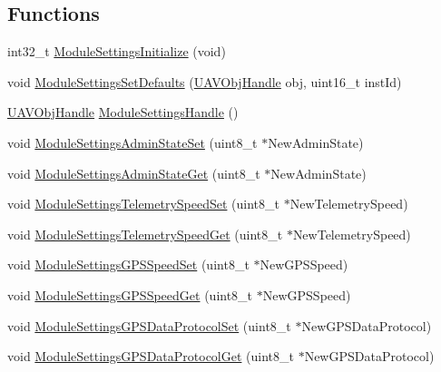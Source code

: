 \subsection*{\-Functions}
\begin{DoxyCompactItemize}
\item 
int32\-\_\-t \hyperlink{group___module_settings_ga839c4047fd745594e796c52e8aa0cbe9}{\-Module\-Settings\-Initialize} (void)
\item 
void \hyperlink{group___module_settings_gaf3ff760bf9cfe5f68cb45fad9c0c02fc}{\-Module\-Settings\-Set\-Defaults} (\hyperlink{targets_2_u_a_v_objects_2inc_2uavobjectmanager_8h_a279053e22be53ce9f895043aaeb91e3b}{\-U\-A\-V\-Obj\-Handle} obj, uint16\-\_\-t inst\-Id)
\item 
\hyperlink{targets_2_u_a_v_objects_2inc_2uavobjectmanager_8h_a279053e22be53ce9f895043aaeb91e3b}{\-U\-A\-V\-Obj\-Handle} \hyperlink{group___module_settings_ga818381d41749d1434bbc59c874a75cc6}{\-Module\-Settings\-Handle} ()
\item 
void \hyperlink{group___module_settings_ga289f9575e5b11b25372c843e8343c9b2}{\-Module\-Settings\-Admin\-State\-Set} (uint8\-\_\-t $\ast$\-New\-Admin\-State)
\item 
void \hyperlink{group___module_settings_gaabf539bcae60bf9ec5b422e99fec1905}{\-Module\-Settings\-Admin\-State\-Get} (uint8\-\_\-t $\ast$\-New\-Admin\-State)
\item 
void \hyperlink{group___module_settings_ga547561fa150a4162482213a50b62613f}{\-Module\-Settings\-Telemetry\-Speed\-Set} (uint8\-\_\-t $\ast$\-New\-Telemetry\-Speed)
\item 
void \hyperlink{group___module_settings_ga88fe6a15759f5c3ae5e293767026f3a0}{\-Module\-Settings\-Telemetry\-Speed\-Get} (uint8\-\_\-t $\ast$\-New\-Telemetry\-Speed)
\item 
void \hyperlink{group___module_settings_ga67597189dff6c21ce3ffec1db754e1cb}{\-Module\-Settings\-G\-P\-S\-Speed\-Set} (uint8\-\_\-t $\ast$\-New\-G\-P\-S\-Speed)
\item 
void \hyperlink{group___module_settings_ga018720efbf54bc1588ea0b4957d4f7b4}{\-Module\-Settings\-G\-P\-S\-Speed\-Get} (uint8\-\_\-t $\ast$\-New\-G\-P\-S\-Speed)
\item 
void \hyperlink{group___module_settings_gac2260d6c0470c5ddd9379bae4a03fa0a}{\-Module\-Settings\-G\-P\-S\-Data\-Protocol\-Set} (uint8\-\_\-t $\ast$\-New\-G\-P\-S\-Data\-Protocol)
\item 
void \hyperlink{group___module_settings_gaad3484ceefd65f6501c0efbfa73a0705}{\-Module\-Settings\-G\-P\-S\-Data\-Protocol\-Get} (uint8\-\_\-t $\ast$\-New\-G\-P\-S\-Data\-Protocol)

\end{DoxyCompactItemize}
